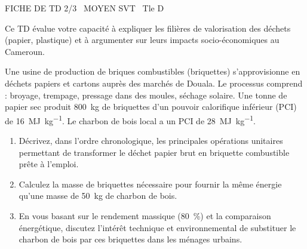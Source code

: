\documentclass[11pt]{article}
\begin{document}
\begin{tcolorbox}[enhanced,colback=popink,colframe=popink,arc=10pt,boxrule=0pt,left=12pt,right=12pt,top=9pt,bottom=9pt]
{\color{white}\popxbold\small FICHE DE TD 2/3 \textbullet\ MOYEN \hfill SVT \textbullet\ Tle D\par}
\end{tcolorbox}
\vspace{4pt}
Ce TD évalue votre capacité à expliquer les filières de valorisation des déchets (papier, plastique) et à argumenter sur leurs impacts socio-économiques au Cameroun.

\begin{exercice}
Une usine de production de briques combustibles (\og briquettes\fg{}) s'approvisionne en déchets papiers et cartons auprès des marchés de Douala. Le processus comprend : broyage, trempage, pressage dans des moules, séchage solaire. Une tonne de papier sec produit \SI{800}{\kilo\gram} de briquettes d'un pouvoir calorifique inférieur (PCI) de \SI{16}{\mega\joule\per\kilo\gram}. Le charbon de bois local a un PCI de \SI{28}{\mega\joule\per\kilo\gram}.
\begin{enumerate}
    \item Décrivez, dans l'ordre chronologique, les principales opérations unitaires permettant de transformer le déchet papier brut en briquette combustible prête à l'emploi.
    \item Calculez la masse de briquettes nécessaire pour fournir la même énergie qu'une masse de \SI{50}{\kilo\gram} de charbon de bois.
    \item En vous basant sur le rendement massique (\SI{80}{\%}) et la comparaison énergétique, discutez l'intérêt technique et environnemental de substituer le charbon de bois par ces briquettes dans les ménages urbains.
\end{enumerate}
\end{exercice}
\end{document}
